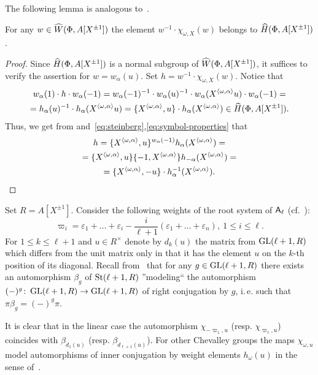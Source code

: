 The following lemma is analogous to~\cite[Lemma~3.1(c)]{Tu83}.
\begin{lemma} \label{lem:winv-chiw}
For any $w \in \widehat{W}(\Phi, A[X^{\pm 1}])$ the element $w^{-1} \cdot \chi_{\omega, X}(w)$ belongs to $\widehat{H}(\Phi, A[X^{\pm 1}])$.
\end{lemma}
\begin{proof}
    Since $\widehat{H}(\Phi, A[X^{\pm 1}])$ is a normal subgroup of $\widehat{W}(\Phi, A[X^{\pm 1}])$, it suffices to verify the assertion for $w = w_\alpha(u)$.
    Set $h = w^{-1} \cdot \chi_{\omega, X}(w)$.
    Notice that
    \begin{multline*} w_\alpha(1) \cdot h\cdot  w_\alpha(-1) = w_\alpha(-1)^{-1} \cdot w_\alpha(u)^{-1} \cdot w_{\alpha}(X^{\langle \omega, \alpha \rangle} u) \cdot w_\alpha(-1) = \\
    = h_\alpha(u)^{-1} \cdot h_\alpha(X^{ \langle \omega, \alpha \rangle }u) = \{ X^{\langle \omega, \alpha \rangle}, u \} \cdot h_\alpha(X^{\langle \omega, \alpha \rangle}) \in \widehat{H}(\Phi, A[X^{\pm 1}]).\end{multline*}
    Thus, we get from\cite[Lemme~5.2]{Ma69} and~\eqref{eq:steinberg},\eqref{eq:symbol-properties} that
     \begin{multline} \label{eq:w-computation} h = \{ X^{\langle \omega, \alpha \rangle}, u \}{}^{w_\alpha(-1)}h_\alpha(X^{\langle \omega, \alpha \rangle}) = \\
      = \{ X^{\langle \omega, \alpha \rangle}, u \} \{ -1, X^{\langle \omega, \alpha \rangle} \} h_{-\alpha}(X^{\langle \omega, \alpha \rangle}) = \\
      = \{ X^{\langle \omega, \alpha \rangle}, -u \} \cdot h_\alpha^{-1}(X^{\langle \omega, \alpha \rangle}).\qedhere\end{multline}
\end{proof}

\begin{example} \label{exm:chi-linear}
Set $R = A[X^{\pm 1}]$.
Consider the following weights of the root system of $\mathsf{A}_\ell$ (cf.~\cite[\S~VI.4.7]{Bou}):
\[ \varpi_{i} = \varepsilon_1 + \ldots + \varepsilon_i - \frac{i}{\ell+1}(\varepsilon_1 + \ldots + \varepsilon_n), \ 1 \leq i \leq \ell. \]
For $1\leq k\leq \ell+1$ and $u \in R^\times$ denote by $d_k(u)$ the matrix from $\operatorname{GL}(\ell+1, R)$ which differs from the unit matrix only in that it has the element $u$ on the $k$-th position of its diagonal.
Recall from~\cite[Corollary~4]{Ka77} that for any $g \in \operatorname{GL}(\ell+1, R)$ there exists an automorphism $\beta_g$ of $\operatorname{St}(\ell+1, R)$ ''modeling`` the automorphism $(-)^g \colon \operatorname{GL}(\ell+1, R) \to \operatorname{GL}(\ell+1, R)$ of right conjugation by $g$, i.\,e. such that $\pi \beta_g = (-)^g \pi$.


It is clear that in the linear case the automorphism $\chi_{-\varpi_1, u}$ (resp. $\chi_{\varpi_{\ell}, u}$) coincides with $\beta_{d_1(u)}$ (resp. $\beta_{d_{\ell+1}(u)}$).
For other Chevalley groups the maps $\chi_{\omega, u}$ model automorphisms of inner conjugation by weight elements $h_\omega(u)$ in the sense of~\cite[\S~4]{Vav09}.
\end{example}


